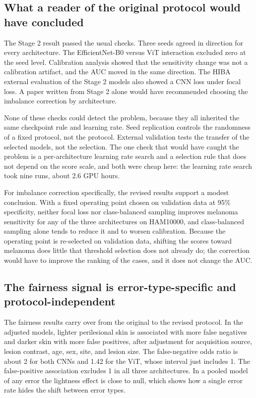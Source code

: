 \subsection{What a reader of the original protocol would have concluded}

The Stage 2 result passed the usual checks. Three seeds agreed in direction for every architecture. The EfficientNet-B0 versus ViT interaction excluded zero at the seed level. Calibration analysis showed that the sensitivity change was not a calibration artifact, and the AUC moved in the same direction. The HIBA external evaluation of the Stage 2 models also showed a CNN loss under focal loss. A paper written from Stage 2 alone would have recommended choosing the imbalance correction by architecture.

None of these checks could detect the problem, because they all inherited the same checkpoint rule and learning rate. Seed replication controls the randomness of a fixed protocol, not the protocol. External validation tests the transfer of the selected models, not the selection. The one check that would have caught the problem is a per-architecture learning rate search and a selection rule that does not depend on the score scale, and both were cheap here: the learning rate search took nine runs, about 2.6 GPU hours.

For imbalance correction specifically, the revised results support a modest conclusion. With a fixed operating point chosen on validation data at 95\% specificity, neither focal loss nor class-balanced sampling improves melanoma sensitivity for any of the three architectures on HAM10000, and class-balanced sampling alone tends to reduce it and to worsen calibration. Because the operating point is re-selected on validation data, shifting the scores toward melanoma does little that threshold selection does not already do; the correction would have to improve the ranking of the cases, and it does not change the AUC.

\subsection{The fairness signal is error-type-specific and protocol-independent}

The fairness results carry over from the original to the revised protocol. In the adjusted models, lighter perilesional skin is associated with more false negatives and darker skin with more false positives, after adjustment for acquisition source, lesion contrast, age, sex, site, and lesion size. The false-negative odds ratio is about 2 for both CNNs and 1.42 for the ViT, whose interval just includes 1. The false-positive association excludes 1 in all three architectures. In a pooled model of any error the lightness effect is close to null, which shows how a single error rate hides the shift between error types.

